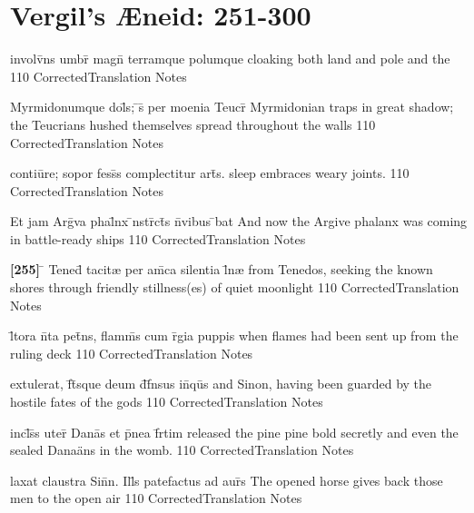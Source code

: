 \section{Vergil's {\AE}neid: 251-300} %

\latline
  {involv\={}ns umbr\={} magn\={} terramque polumque}
  { cloaking both land and pole and the }
  {110}
  { CorrectedTranslation }
  { Notes }


\latline
  {Myrmidonumque dol\={}s; \={}s\={\macron {\i}} per moenia Teucr\={\macron {\i}}}
  { Myrmidonian traps in great shadow; the Teucrians hushed themselves spread throughout the walls}
  {110}
  { CorrectedTranslation }
  { Notes }


\latline
  {contiu\={}re; sopor fess\={}s complectitur art\={}s.}
  { sleep embraces weary joints. }
  {110}
  { CorrectedTranslation }
  { Notes }


\latline
  {Et jam Arg\={\macron {\i}}va phal\={}nx \={\macron {\i}}nstr\={}ct\={\macron {\i}}s n\={}vibus \={\macron {\i}}bat}
  { And now the Argive phalanx was coming in battle-ready ships }
  {110}
  { CorrectedTranslation }
  { Notes }


\latline
  {\textbf{[255]} \={} Tened\={} tacit{\ae} per am\={\macron {\i}}ca silentia l\={}n{\ae}}
  { from Tenedos, seeking the known shores through friendly stillness(es) of quiet moonlight }
  {110}
  { CorrectedTranslation }
  { Notes }


\latline
  {l\={\macron {\i}}tora n\={}ta pet\={}ns, flamm\={}s cum r\={}gia puppis}
  { when flames had been sent up from the ruling deck }
  {110}
  { CorrectedTranslation }
  { Notes }


\latline
  {extulerat, f\={}t\={\macron {\i}}sque deum d\={}f\={}nsus in\={\macron {\i}}qu\={\macron {\i}}s}
  { and Sinon, having been guarded by the hostile fates of the gods }
  {110}
  { CorrectedTranslation }
  { Notes }


\latline
  {incl\={}s\={}s uter\={} Dana\={}s et p\={\macron {\i}}nea f\={}rtim}
  { released the pine pine bold secretly and even the sealed Dana\"ans in the womb.  }
  {110}
  { CorrectedTranslation }
  { Notes }


\latline
  {laxat claustra Sin\={}n.  Ill\={}s patefactus ad aur\={}s}
  { The opened horse gives back those men to the open air }
  {110}
  { CorrectedTranslation }
  { Notes }


